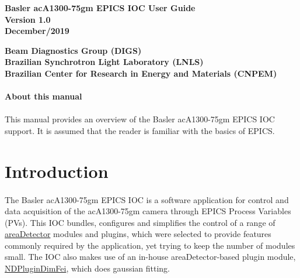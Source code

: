 \documentclass[openany]{article}
\begin{document}
\begin{titlepage}

\thispagestyle{fancy}

\begin{center}

\vspace*{\fill}
\textbf{\Huge Basler acA1300-75gm EPICS IOC User Guide}\\[20pt]
\textbf{\Huge Version 1.0}\\[20pt]
\textbf{\Huge December/2019}
\vspace*{\fill}

\vfill
\textbf{Beam Diagnostics Group (DIGS)}\\[5pt]
\textbf{Brazilian Synchrotron Light Laboratory (LNLS)}\\[5pt]
\textbf{Brazilian Center for Research in Energy and Materials (CNPEM)}
\end{center}

\end{titlepage}

\newpage
\pagestyle{plain} %

\paragraph{}{\Large\bfseries About this manual}

\paragraph{} This manual provides an overview of the Basler acA1300-75gm EPICS IOC support. It is assumed that the reader is familiar with the basics of EPICS.

\tableofcontents

\newpage
\section{Introduction}

\paragraph{} The Basler acA1300-75gm EPICS IOC is a software application for control and data acquisition of the acA1300-75gm camera through EPICS Process Variables (PVs). This IOC bundles, configures and simplifies the control of a range of \href{https://github.com/areaDetector/areaDetector}{areaDetector} modules and plugins, which were selected to provide features commonly required by the application, yet trying to keep the number of modules small. The IOC also makes use of an in-house areaDetector-based plugin module, \href{https://github.com/}{NDPluginDimFei}, which does gaussian fitting.
\end{document}
